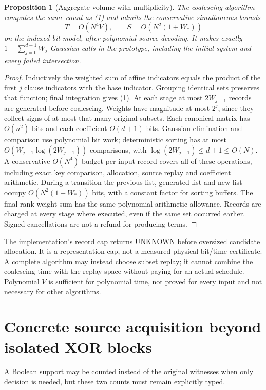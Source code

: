 \documentclass[11pt]{article}
\newtheorem{proposition}[theorem]{Proposition}
\begin{document}
\begin{proposition}[Aggregate volume with multiplicity]\label{prop:volume}
The coalescing algorithm computes the same count as (1) and admits the
conservative simultaneous bounds
\[
 T=O(N^4 V),\qquad S=O(N^2(1+W_*))                             \tag{3}
\]
on the indexed bit model, after polynomial source decoding.
It makes exactly $1+\sum_{j=0}^{d-1}W_j$ Gaussian calls in the prototype,
including the initial system and every failed intersection.
\end{proposition}
\begin{proof}
Inductively the weighted sum of affine indicators equals the product of
the first $j$ clause indicators with the base indicator. Grouping identical
sets preserves that function; final integration gives (1).
At each stage at most $2W_{j-1}$ records are generated before coalescing.
Weights have magnitude at most $2^j$, since they collect signs of at most
that many original subsets. Each canonical matrix has $O(n^2)$ bits and
each coefficient $O(d+1)$ bits. Gaussian elimination and comparison use
polynomial bit work; deterministic sorting has at most
$O(W_{j-1}\log(2W_{j-1}))$ comparisons, with
$\log(2W_{j-1})\le d+1\le O(N)$.
A conservative $O(N^4)$ budget per input record covers all of these operations,
including exact key comparison, allocation, source replay and coefficient
arithmetic. During a transition the previous list, generated list and new
list occupy $O(N^2(1+W_*))$ bits, with a constant factor for sorting buffers.
The final rank-weight sum has the same polynomial arithmetic allowance.
Records are charged at every stage where executed, even if the same set
occurred earlier. Signed cancellations are not a refund for producing terms.
\end{proof}

The implementation's record cap returns UNKNOWN before oversized candidate
allocation. It is a representation cap, not a measured physical bit/time
certificate. A complete algorithm may instead choose subset replay; it
cannot combine the coalescing time with the replay space without paying for
an actual schedule. Polynomial $V$ is sufficient for polynomial time,
not proved for every input and not necessary for other algorithms.

\section{Concrete source acquisition beyond isolated XOR blocks}
A Boolean support may be counted instead of the original witnesses when only
decision is needed, but these two counts must remain explicitly typed.
\end{document}
